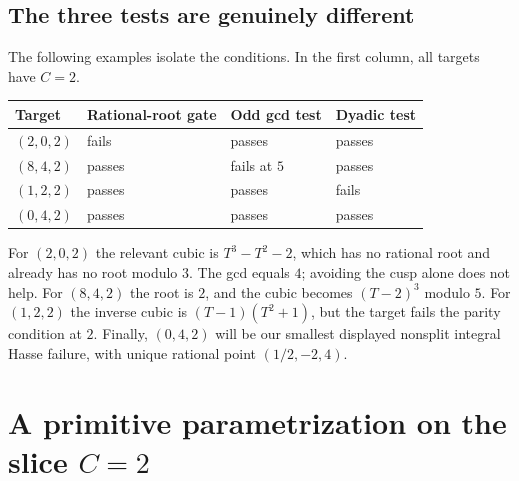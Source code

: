 \documentclass[11pt]{article}
\numberwithin{equation}{section}
\theoremstyle{plain}
\theoremstyle{plain}
\theoremstyle{plain}
\theoremstyle{definition}
\theoremstyle{definition}
\theoremstyle{definition}
\theoremstyle{remark}
\begin{document}
\subsection{The three tests are genuinely different}
The following examples isolate the conditions. In the first column,
all targets have $C=2$.
\begin{center}
\begin{tabular}{@{}llll@{}}
\toprule
Target & Rational-root gate & Odd gcd test & Dyadic test\\
\midrule
$(2,0,2)$ & fails & passes & passes\\
$(8,4,2)$ & passes & fails at $5$ & passes\\
$(1,2,2)$ & passes & passes & fails\\
$(0,4,2)$ & passes & passes & passes\\
\bottomrule
\end{tabular}
\end{center}
For $(2,0,2)$ the relevant cubic is $T^3-T^2-2$, which has no rational
root and already has no root modulo $3$. The gcd equals $4$; avoiding
the cusp alone does not help. For $(8,4,2)$ the root is $2$, and the
cubic becomes $(T-2)^3$ modulo $5$. For $(1,2,2)$ the inverse cubic is
$(T-1)(T^2+1)$, but the target fails the parity condition at $2$.
Finally, $(0,4,2)$ will be our smallest displayed nonsplit integral
Hasse failure, with unique rational point $(1/2,-2,4)$.

\section{A primitive parametrization on the slice \texorpdfstring{$C=2$}{C=2}}\label{alg:ns:sec:slice}
\end{document}
